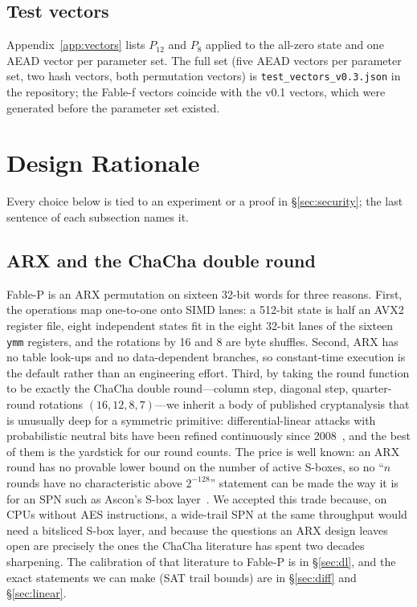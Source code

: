 \documentclass{iacrtrans}
\newcommand{\FableP}{\textsf{Fable-P}\xspace}
\newcommand{\FableF}{\textsf{Fable-f}\xspace}
\newcommand{\ChaCha}{\textsf{ChaCha}\xspace}
\newcommand{\PP}[1]{P_{#1}}
\begin{document}
\subsection{Test vectors}
Appendix~\ref{app:vectors} lists $\PP{12}$ and $\PP{8}$ applied to the all-zero state and one AEAD vector per parameter set. The full set (five AEAD vectors per parameter set, two hash vectors, both permutation vectors) is \texttt{test\_vectors\_v0.3.json} in the repository; the \FableF vectors coincide with the v0.1 vectors, which were generated before the parameter set existed.

\section{Design Rationale}
\label{sec:rationale}

Every choice below is tied to an experiment or a proof in \S\ref{sec:security}; the last sentence of each subsection names it.

\subsection{ARX and the \ChaCha double round}
\label{sec:whyarx}
\FableP is an ARX permutation on sixteen 32-bit words for three reasons. First, the operations map one-to-one onto SIMD lanes: a 512-bit state is half an AVX2 register file, eight independent states fit in the eight 32-bit lanes of the sixteen \texttt{ymm} registers, and the rotations by 16 and 8 are byte shuffles. Second, ARX has no table look-ups and no data-dependent branches, so constant-time execution is the default rather than an engineering effort. Third, by taking the round function to be exactly the \ChaCha double round---column step, diagonal step, quarter-round rotations $(16,12,8,7)$---we inherit a body of published cryptanalysis that is unusually deep for a symmetric primitive: differential-linear attacks with probabilistic neutral bits have been refined continuously since 2008~\cite{AFKMR08,BLT20,BBCDFLNT22,CS21,DGSS22,DGM23,WLHL23,Dey24,SDSM25,FT25,FT25b}, and the best of them is the yardstick for our round counts. The price is well known: an ARX round has no provable lower bound on the number of active S-boxes, so no ``$n$ rounds have no characteristic above $2^{-128}$'' statement can be made the way it is for an SPN such as Ascon's S-box layer~\cite{Ascon21}. We accepted this trade because, on CPUs without AES instructions, a wide-trail SPN at the same throughput would need a bitsliced S-box layer, and because the questions an ARX design leaves open are precisely the ones the \ChaCha literature has spent two decades sharpening. The calibration of that literature to \FableP is in \S\ref{sec:dl}, and the exact statements we can make (SAT trail bounds) are in \S\ref{sec:diff} and \S\ref{sec:linear}.
\end{document}
